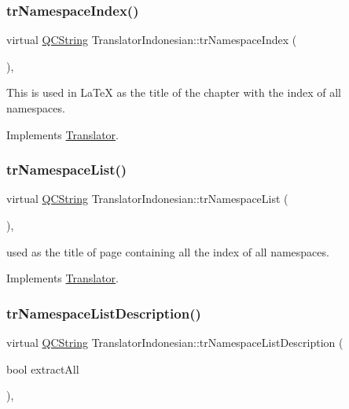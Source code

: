 \subsubsection{\texorpdfstring{trNamespaceIndex()}{trNamespaceIndex()}}
{\footnotesize\ttfamily virtual \mbox{\hyperlink{class_q_c_string}{Q\+C\+String}} Translator\+Indonesian\+::tr\+Namespace\+Index (\begin{DoxyParamCaption}{ }\end{DoxyParamCaption})\hspace{0.3cm}{\ttfamily [inline]}, {\ttfamily [virtual]}}

This is used in La\+TeX as the title of the chapter with the index of all namespaces. 

Implements \mbox{\hyperlink{class_translator}{Translator}}.

\mbox{\label{class_translator_indonesian_a60f02406f5c6ef196fb140f0895976b6}} 
\subsubsection{\texorpdfstring{trNamespaceList()}{trNamespaceList()}}
{\footnotesize\ttfamily virtual \mbox{\hyperlink{class_q_c_string}{Q\+C\+String}} Translator\+Indonesian\+::tr\+Namespace\+List (\begin{DoxyParamCaption}{ }\end{DoxyParamCaption})\hspace{0.3cm}{\ttfamily [inline]}, {\ttfamily [virtual]}}

used as the title of page containing all the index of all namespaces. 

Implements \mbox{\hyperlink{class_translator}{Translator}}.

\mbox{\label{class_translator_indonesian_a6f87fc8b889c6e006127aebe9321372e}} 
\subsubsection{\texorpdfstring{trNamespaceListDescription()}{trNamespaceListDescription()}}
{\footnotesize\ttfamily virtual \mbox{\hyperlink{class_q_c_string}{Q\+C\+String}} Translator\+Indonesian\+::tr\+Namespace\+List\+Description (\begin{DoxyParamCaption}\item[{bool}]{extract\+All }\end{DoxyParamCaption})\hspace{0.3cm}{\ttfamily [inline]}, {\ttfamily [virtual]}}

